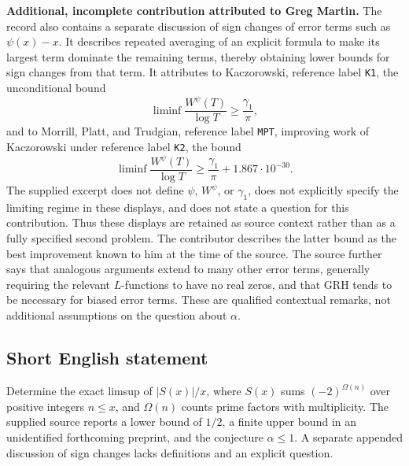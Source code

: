 \documentclass[11pt]{article}
\begin{document}
\textbf{Additional, incomplete contribution attributed to Greg Martin.} The record also contains a separate discussion of sign changes of error terms such as \(\psi(x)-x\). It describes repeated averaging of an explicit formula to make its largest term dominate the remaining terms, thereby obtaining lower bounds for sign changes from that term. It attributes to Kaczorowski, reference label \texttt{K1}, the unconditional bound
\[
\liminf \frac{W^\psi(T)}{\log T}\geq \frac{\gamma_1}{\pi},
\]
and to Morrill, Platt, and Trudgian, reference label \texttt{MPT}, improving work of Kaczorowski under reference label \texttt{K2}, the bound
\[
\liminf \frac{W^\psi(T)}{\log T}\geq \frac{\gamma_1}{\pi}+1.867\cdot 10^{-30}.
\]
The supplied excerpt does not define \(\psi\), \(W^\psi\), or \(\gamma_1\), does not explicitly specify the limiting regime in these displays, and does not state a question for this contribution. Thus these displays are retained as source context rather than as a fully specified second problem. The contributor describes the latter bound as the best improvement known to him at the time of the source. The source further says that analogous arguments extend to many other error terms, generally requiring the relevant \(L\)-functions to have no real zeros, and that GRH tends to be necessary for biased error terms. These are qualified contextual remarks, not additional assumptions on the question about \(\alpha\).
\subsection{Short English statement}
Determine the exact limsup of \(|S(x)|/x\), where \(S(x)\) sums \((-2)^{\Omega(n)}\) over positive integers \(n\leq x\), and \(\Omega(n)\) counts prime factors with multiplicity. The supplied source reports a lower bound of \(1/2\), a finite upper bound in an unidentified forthcoming preprint, and the conjecture \(\alpha\leq 1\). A separate appended discussion of sign changes lacks definitions and an explicit question.
\end{document}
